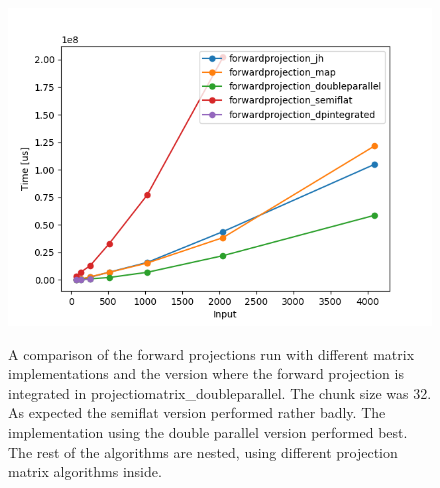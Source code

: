 \begin{figure}[h]
\includegraphics{images/forwardprojection_32.png}
\label{fpcompare}
  \caption{A comparison of the forward projections run with different matrix implementations and the version where the forward projection is integrated in projectiomatrix\_doubleparallel. The chunk size was 32. As expected the semiflat version performed rather badly. The implementation using the double parallel version performed best. The rest of the algorithms are nested, using different projection matrix algorithms inside.}
\end{figure}
